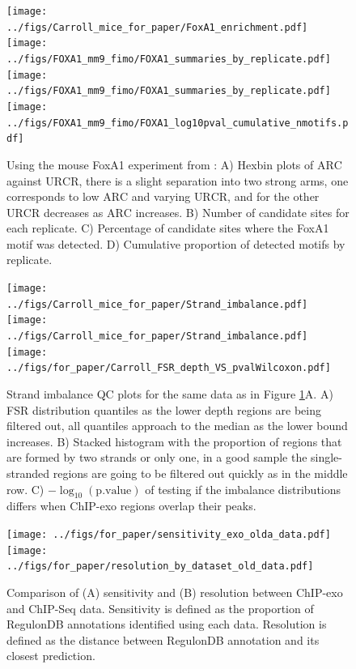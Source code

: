 \documentclass{bmcart}\usepackage[]{graphicx}\usepackage[]{color}
\begin{document}
\newpage

\begin{figure}[h!]
  \centering
  \texttt{[image: ../figs/Carroll\_mice\_for\_paper/FoxA1\_enrichment.pdf]}
  \newline
  \texttt{[image: ../figs/FOXA1\_mm9\_fimo/FOXA1\_summaries\_by\_replicate.pdf]}
  \texttt{[image: ../figs/FOXA1\_mm9\_fimo/FOXA1\_summaries\_by\_replicate.pdf]}
  \texttt{[image: ../figs/FOXA1\_mm9\_fimo/FOXA1\_log10pval\_cumulative\_nmotifs.pdf]}
  \caption{Using the mouse FoxA1 experiment from \cite{exoillumina}:
    A) Hexbin plots of $\mbox{ARC}$ against $\mbox{URCR}$, there is a
    slight separation into two strong arms, one corresponds to low
    $\mbox{ARC}$ and varying $\mbox{URCR}$, and for the other
    $\mbox{URCR}$ decreases as $\mbox{ARC}$ increases. B) Number of
    candidate sites for each replicate. C) Percentage of candidate
    sites where the FoxA1 motif was detected. D) Cumulative
    proportion of detected motifs by replicate.}
  \label{fig:enrich}
\end{figure}

\newpage


\begin{figure}[h!]
  \centering  
  \texttt{[image: ../figs/Carroll\_mice\_for\_paper/Strand\_imbalance.pdf]} 
  \newline
  \texttt{[image: ../figs/Carroll\_mice\_for\_paper/Strand\_imbalance.pdf]} 
  \texttt{[image: ../figs/for\_paper/Carroll\_FSR\_depth\_VS\_pvalWilcoxon.pdf]}
  \caption{Strand imbalance QC plots for the same data as in Figure
    \ref{fig:enrich}A. A) FSR distribution quantiles as the lower
    depth regions are being filtered out, all quantiles approach to
    the median as the lower bound increases. B) Stacked histogram with
    the proportion of regions that are formed by two strands or only
    one, in a good sample the single-stranded regions are going to be
    filtered out quickly as in the middle row. C)
    $-\log_{10}(\text{p.value})$ of testing if the imbalance
    distributions differs when ChIP-exo regions overlap their peaks.}
  \label{fig:strand}
\end{figure}

\newpage

\begin{figure}[h!]
  \centering
  \texttt{[image: ../figs/for\_paper/sensitivity\_exo\_olda\_data.pdf]}
  \texttt{[image: ../figs/for\_paper/resolution\_by\_dataset\_old\_data.pdf]}
   \caption{Comparison of (A) sensitivity and (B) resolution between
     ChIP-exo and ChIP-Seq data. Sensitivity is defined as the
     proportion of RegulonDB annotations identified using each
     data. Resolution is defined as the distance between RegulonDB
     annotation and its closest prediction.}
  \label{fig:reso_all}
\end{figure}
\end{document}
